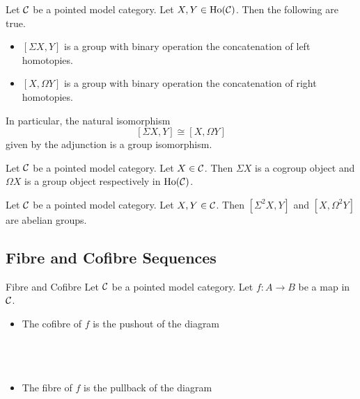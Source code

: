 \documentclass[a4paper]{article}
\begin{document}
\begin{thm}{}{} Let $\mathcal{C}$ be a pointed model category. Let $X,Y\in\text{Ho}(\mathcal{C})$. Then the following are true. 
\begin{itemize}
\item $[\Sigma X,Y]$ is a group with binary operation the concatenation of left homotopies. 
\item $[X,\Omega Y]$ is a group with binary operation the concatenation of right homotopies. 
\end{itemize}
In particular, the natural isomorphism $$[\Sigma X,Y]\cong[X,\Omega Y]$$ given by the adjunction is a group isomorphism. 
\end{thm}

\begin{crl}{}{} Let $\mathcal{C}$ be a pointed model category. Let $X\in\mathcal{C}$. Then $\Sigma X$ is a cogroup object and $\Omega X$ is a group object respectively in $\text{Ho}(\mathcal{C})$. 
\end{crl}

\begin{crl}{}{} Let $\mathcal{C}$ be a pointed model category. Let $X,Y\in\mathcal{C}$. Then $[\Sigma^2 X,Y]$ and $[X,\Omega^2Y]$ are abelian groups. 
\end{crl}

\subsection{Fibre and Cofibre Sequences}
\begin{defn}{Fibre and Cofibre}{} Let $\mathcal{C}$ be a pointed model category. Let $f:A\to B$ be a map in $\mathcal{C}$. 
\begin{itemize}
\item The cofibre of $f$ is the pushout of the diagram \\~\\
\\~\\
\item The fibre of $f$ is the pullback of the diagram \\~\\
\\~\\
\end{itemize}
\end{defn}
\end{document}
